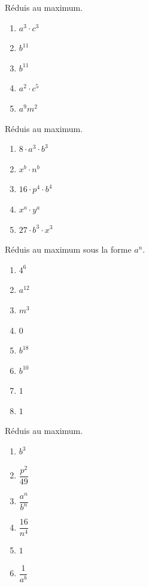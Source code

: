 \setcounter{exercise}{0}

\begin{exercise}
  Réduis au maximum.
  \begin{enumerate}[cols=5]
    \item \(a^{3} \cdot c^{3}\)
    \item \(b^{11} \)
    \item \(b^{11} \)
    \item \(a^{2} \cdot c^{5} \)
    \item \(a^{9}m^{2} \)
  \end{enumerate}
\end{exercise}

\begin{exercise}
  Réduis au maximum.
  \begin{enumerate}[cols=5]
    \item \(8 \cdot a^{3} \cdot b^{3}\)
    \item \(x^{b} \cdot n^{b} \)
    \item \(16 \cdot p^{4} \cdot b^{4} \)
    \item \(x^{a} \cdot y^{a} \)
    \item \(27 \cdot b^{3} \cdot x^{3} \)    
  \end{enumerate}
\end{exercise}

\begin{exercise}
  Réduis au maximum sous la forme $a^n$.
  \begin{enumerate}[cols=6]
    \item \(4^{6} \)
    \item \(a^{12} \)
    \item \(m^{3} \)
    \item \(0\)
    \item \(b^{18}\)
    \item \(b^{10} \)
    \item \(1\)
    \item \(1\)
  \end{enumerate}
\end{exercise}

\begin{exercise}
  Réduis au maximum.
  \begin{enumerate}[cols=6]
    \item \(b^{3}\)
    \item \(\dfrac{p^{2}}{49}  \)
    \item \(\dfrac{a^{n}}{b^{n}}\)
    \item \(\dfrac{16}{n^{4}}\)
    \item \(1\)
    \item \(\dfrac{1}{a^{b}}\)
  \end{enumerate}
\end{exercise}

